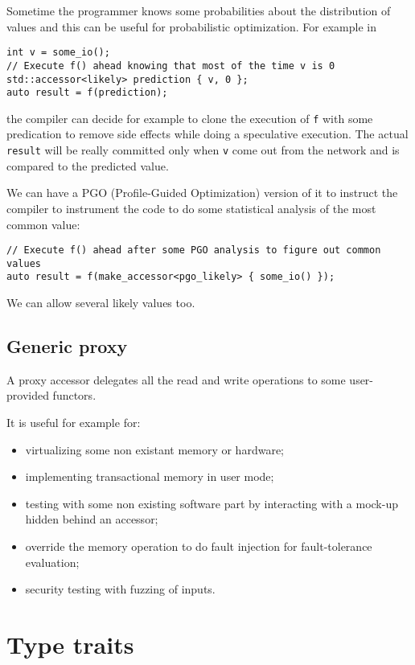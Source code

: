\documentclass[a4paper]{article}
\begin{document}
Sometime the programmer knows some probabilities about the
distribution of values and this can be useful for probabilistic
optimization. For example in
\begin{lstlisting}
int v = some_io();
// Execute f() ahead knowing that most of the time v is 0
std::accessor<likely> prediction { v, 0 };
auto result = f(prediction);
\end{lstlisting}
the compiler can decide for example to clone the execution of
\texttt{f} with some predication to remove side effects while doing a
speculative execution. The actual \texttt{result} will be really
committed only when \texttt{v} come out from the network and is
compared to the predicted value.


We can have a PGO (Profile-Guided Optimization) version of it to
instruct the compiler to instrument the code to do some statistical
analysis of the most common value:
\begin{lstlisting}
// Execute f() ahead after some PGO analysis to figure out common values
auto result = f(make_accessor<pgo_likely> { some_io() });
\end{lstlisting}

We can allow several likely values too.


\subsection{Generic proxy}
\label{sec:generic-proxy}

A proxy accessor delegates all the read and write operations to some
user-provided functors.

It is useful for example for:
\begin{itemize}
\item virtualizing some non existant memory or hardware;
\item implementing transactional memory in user mode;
\item testing with some non existing software part by interacting with
  a mock-up hidden behind an accessor;
\item override the memory operation to do fault injection for
  fault-tolerance evaluation;
\item security testing with fuzzing of inputs.
\end{itemize}


\section{Type traits}
\label{sec:type-traits}
\end{document}

